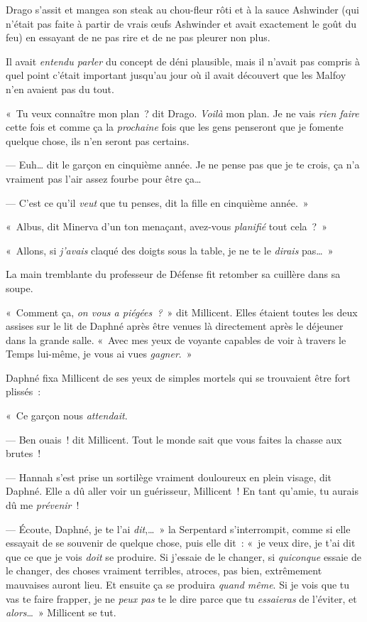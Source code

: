 \later

Drago s'assit et mangea son steak au chou-fleur rôti et à la sauce Ashwinder (qui n'était pas faite à partir de vrais œufs Ashwinder et avait exactement le goût du feu) en essayant de ne pas rire et de ne pas pleurer non plus.

Il avait \emph{entendu parler} du concept de déni plausible, mais il n'avait pas compris à quel point c'était important jusqu'au jour où il avait découvert que les Malfoy n'en avaient pas du tout.

«~Tu veux connaître mon plan~? dit Drago.
\emph{Voilà} mon plan.
Je ne vais \emph{rien faire} cette fois et comme ça la \emph{prochaine} fois que les gens penseront que je fomente quelque chose, ils n'en seront pas certains.

--- Euh… dit le garçon en cinquième année.
Je ne pense pas que je te crois, ça n'a vraiment pas l'air assez fourbe pour être ça…

--- C'est ce qu'il \emph{veut} que tu penses, dit la fille en cinquième année.~»

\later

«~Albus, dit Minerva d'un ton menaçant, avez-vous \emph{planifié} tout cela~?~»

\later

«~Allons, si \emph{j'avais} claqué des doigts sous la table, je ne te le \emph{dirais} pas…~»

\later

La main tremblante du professeur de Défense fit retomber sa cuillère dans sa soupe.

\later

«~Comment ça, \emph{on vous a piégées~?}~» dit Millicent.
Elles étaient toutes les deux assises sur le lit de Daphné après être venues là directement après le déjeuner dans la grande salle.
«~Avec mes yeux de voyante capables de voir à travers le Temps lui-même, je vous ai vues \emph{gagner}.~»

Daphné fixa Millicent de ses yeux de simples mortels qui se trouvaient être fort plissés~:

«~Ce garçon nous \emph{attendait}.

--- Ben ouais~! dit Millicent.
Tout le monde sait que vous faites la chasse aux brutes~!

--- Hannah s'est prise un sortilège vraiment douloureux en plein visage, dit Daphné.
Elle a dû aller voir un guérisseur, Millicent~!
En tant qu'amie, tu aurais dû me \emph{prévenir}~!

--- Écoute, Daphné, je te l'ai \emph{dit},…~»
la Serpentard s'interrompit, comme si elle essayait de se souvenir de quelque chose, puis elle dit~: «~je veux dire, je t'ai dit que ce que je vois \emph{doit} se produire.
Si j'essaie de le changer, si \emph{quiconque} essaie de le changer, des choses vraiment terribles, atroces, pas bien, extrêmement mauvaises auront lieu.
Et ensuite ça se produira \emph{quand même}.
Si je vois que tu vas te faire frapper, je ne \emph{peux pas} te le dire parce que tu \emph{essaieras} de l'éviter, et \emph{alors}…~»
Millicent se tut.

